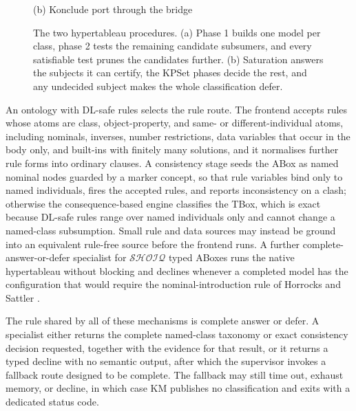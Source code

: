 \begin{figure}[t]
\begin{minipage}[t]{0.5\textwidth}
\small (b) Konclude port through the bridge
\end{minipage}
\caption{The two hypertableau procedures.  (a) Phase 1 builds one model per
class, phase 2 tests the remaining candidate subsumers, and every satisfiable
test prunes the candidates further.  (b) Saturation answers the subjects it
can certify, the KPSet phases decide the rest, and any undecided subject makes
the whole classification defer.}
\label{fig:flow-ht}
\end{figure}

An ontology with DL-safe rules selects the rule route.  The frontend accepts
rules whose atoms are class, object-property, and same- or different-individual
atoms, including nominals, inverses, number restrictions, data variables that
occur in the body only, and built-ins with finitely many solutions, and it
normalises further rule forms into ordinary clauses.  A consistency
stage seeds the ABox as named nominal nodes guarded by a marker concept, so
that rule variables bind only to named individuals, fires the accepted rules,
and reports inconsistency on a clash; otherwise the consequence-based engine
classifies the TBox, which is exact because DL-safe rules range over named
individuals only and cannot change a named-class subsumption.  Small rule and
data sources may instead be ground into an equivalent rule-free source before
the frontend runs.  A further complete-answer-or-defer specialist for
$\mathcal{SHOIQ}$ typed ABoxes runs the native hypertableau without blocking
and declines whenever a completed model has the configuration that would
require the nominal-introduction rule of Horrocks and Sattler
\cite{horrocks2007shoiq}.

The rule shared by all of these mechanisms is complete answer or defer.  A
specialist either returns the complete named-class taxonomy or exact
consistency decision requested, together with the evidence for that result,
or it returns a typed decline with no semantic output, after which the
supervisor invokes a fallback route designed to be complete.  The fallback
may still time out, exhaust memory, or decline, in which case KM publishes no
classification and exits with a dedicated status code.
